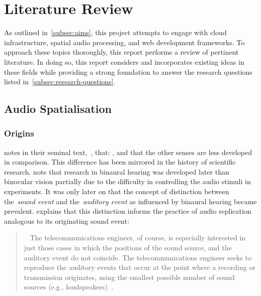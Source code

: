 
\thispagestyle{plain}
\newpage
\section{Literature Review}\label{sec:literature-review}

\normalsize

As outlined in~\ref{subsec:aims}, this project attempts to engage with cloud infrastructure, spatial audio processing, and web development frameworks.
To approach these topics thoroughly, this report performs a review of pertinent literature.
In doing so, this report considers and incorporates existing ideas in these fields while providing a strong foundation to answer the research questions listed in~\ref{subsec:research-questions}.

\subsection{Audio Spatialisation}\label{subsec:audio-spatialisation}
\subsubsection{Origins}

\citet{blauert_spatial} notes in their seminal text,~\textit{}, that: , and that the other senses are less developed in comparison.
This difference has been mirrored in the history of scientific research.
\citet{wade_binaural} note that research in binaural hearing was developed later than binocular vision partially due to the difficulty in controlling the audio stimuli in experiments.
It was only later on that the concept of distinction between the~\textit{sound event} and the~\textit{auditory event} as influenced by binaural hearing became prevalent.
\citet{blauert_spatial} explains that this distinction informs the practice of audio replication analogous to its originating sound event:

\begin{quotation}~
    The telecommunications engineer, of course, is especially interested in just those cases in which the positions of the sound source, and the auditory event do not coincide.
    The telecommunications engineer seeks to reproduce the auditory events that occur at the point where a recording or transmission originates, using the smallest possible number of sound sources (e.g., loudspeakers)~\citep{blauert_spatial}.
\end{quotation}

